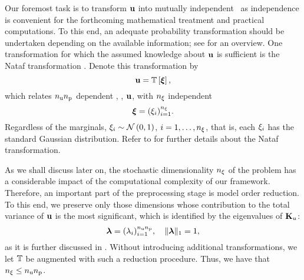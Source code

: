 Our foremost task is to transform $\mathbf{u}$ into mutually independent \rvs\ as independence is convenient for the forthcoming mathematical treatment and practical computations.
To this end, an adequate probability transformation should be undertaken depending on the available information; see \cite{eldred2008} for an overview.
One transformation for which the assumed knowledge about $\mathbf{u}$ is sufficient is the Nataf transformation \cite{li2008}.
Denote this transformation by
\begin{equation} \elab{probability-transformation}
  \vu = \transformation{\vz},
\end{equation}
which relates ${n_\text{u}} {n_\text{p}}$ dependent \rvs, \ie, $\mathbf{u}$, with ${n_\xi}$ independent \rvs
\begin{equation} \elab{independent-random-variables}
  \vz = (\z_i)_{i = 1}^\nvars.
\end{equation}
Regardless of the marginals, $\xi_i \sim \mathcal{N}\left( 0, 1 \right)$, $i = 1, \dots, {n_\xi}$, that is, each $\xi_i$ has the standard Gaussian distribution.
Refer to  for further details about the Nataf transformation.

As we shall discuss later on, the stochastic dimensionality ${n_\xi}$ of the problem has a considerable impact of the computational complexity of our framework.
Therefore, an important part of the preprocessing stage is model order reduction.
To this end, we preserve only those dimensions whose contribution to the total variance of $\mathbf{u}$ is the most significant, which is identified by the eigenvalues of $\mathbf{K}_u$:
\begin{equation} \elab{dimension-contribution}
  \dimensionContribution = (\lambda_i)_{i = 1}^{\nparams \nprocs}, \hspace{1em} \norm[1]{\dimensionContribution} = 1,
\end{equation}
as it is further discussed in .
Without introducing additional transformations, we let $\transformation$ be augmented with such a reduction procedure.
Thus, we have that ${n_\xi} \leq {n_\text{u}} {n_\text{p}}$.

